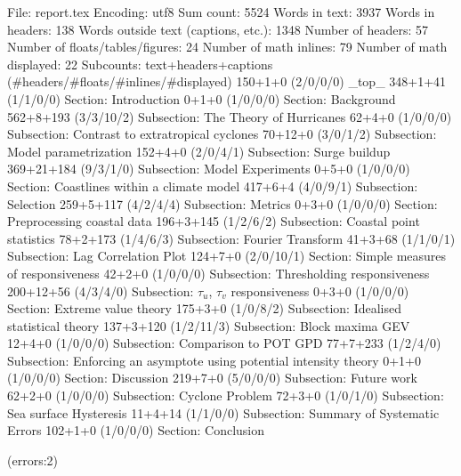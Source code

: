 
File: report.tex
Encoding: utf8
Sum count: 5524
Words in text: 3937
Words in headers: 138
Words outside text (captions, etc.): 1348
Number of headers: 57
Number of floats/tables/figures: 24
Number of math inlines: 79
Number of math displayed: 22
Subcounts:
  text+headers+captions (#headers/#floats/#inlines/#displayed)
  150+1+0 (2/0/0/0) _top_
  348+1+41 (1/1/0/0) Section: Introduction
  0+1+0 (1/0/0/0) Section: Background
  562+8+193 (3/3/10/2) Subsection: The Theory of Hurricanes
  62+4+0 (1/0/0/0) Subsection: Contrast to extratropical cyclones
  70+12+0 (3/0/1/2) Subsection: Model parametrization
  152+4+0 (2/0/4/1) Subsection: Surge buildup
  369+21+184 (9/3/1/0) Subsection: Model Experiments
  0+5+0 (1/0/0/0) Section: Coastlines within a climate model
  417+6+4 (4/0/9/1) Subsection: Selection
  259+5+117 (4/2/4/4) Subsection: Metrics
  0+3+0 (1/0/0/0) Section: Preprocessing coastal data
  196+3+145 (1/2/6/2) Subsection: Coastal point statistics
  78+2+173 (1/4/6/3) Subsection: Fourier Transform
  41+3+68 (1/1/0/1) Subsection: Lag Correlation Plot
  124+7+0 (2/0/10/1) Section: Simple measures of responsiveness
  42+2+0 (1/0/0/0) Subsection: Thresholding responsiveness
  200+12+56 (4/3/4/0) Subsection: $\tau_u$, $\tau_v$ responsiveness
  0+3+0 (1/0/0/0) Section: Extreme value theory
  175+3+0 (1/0/8/2) Subsection: Idealised statistical theory
  137+3+120 (1/2/11/3) Subsection: Block maxima GEV
  12+4+0 (1/0/0/0) Subsection: Comparison to POT GPD
  77+7+233 (1/2/4/0) Subsection: Enforcing an asymptote using potential intensity theory 
  0+1+0 (1/0/0/0) Section: Discussion
  219+7+0 (5/0/0/0) Subsection: Future work
  62+2+0 (1/0/0/0) Subsection: Cyclone Problem
  72+3+0 (1/0/1/0) Subsection: Sea surface Hysteresis
  11+4+14 (1/1/0/0) Subsection: Summary of Systematic Errors
  102+1+0 (1/0/0/0) Section: Conclusion

(errors:2)
